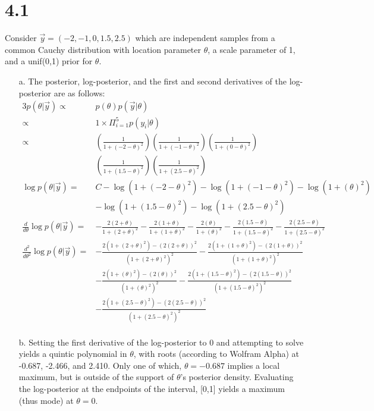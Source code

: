 \documentclass[12pt]{article}
\begin{document}
\section*{4.1} Consider $\vec{y}=(-2, -1, 0, 1.5, 2.5)$ which are independent samples from a common Cauchy distribution with location parameter $\theta$, a scale parameter of 1, and a unif(0,1) prior for $\theta$.
\begin{enumerate}
	\item[a.] The posterior, log-posterior, and the first and second derivatives of the log-posterior are as follows:
	\begin{alignat*}{3}
	p(\theta | \vec{y}) \propto & p(\theta) p(\vec{y} | \theta) \\
	\propto & 1 \times \Pi_{i=1}^5 p(y_i | \theta) \\
	\propto & \left(\frac{1}{1+(-2 - \theta)^2}\right)\left(\frac{1}{1+(-1 - \theta)^2}\right)\left(\frac{1}{1+(0 - \theta)^2}\right) \\ & \left(\frac{1}{1+(1.5 - \theta)^2}\right)\left(\frac{1}{1+(2.5 - \theta)^2}\right) \\
	\log p(\theta | \vec{y}) =&  C - \log\left( 1+(-2-\theta)^2 \right) - \log\left( 1+(-1-\theta)^2 \right)- \log\left( 1+(\theta)^2 \right) \\ & - \log\left( 1+(1.5-\theta)^2 \right)- \log\left( 1+(2.5-\theta)^2 \right) \\
	\frac{d}{d\theta}\log p(\theta | \vec{y}) = & -\frac{2(2+\theta)}{1+(2+\theta)^2}-\frac{2(1+\theta)}{1+(1+\theta)^2}-\frac{2(\theta)}{1+(\theta)^2}-\frac{2(1.5-\theta)}{1+(1.5-\theta)^2}-\frac{2(2.5-\theta)}{1+(2.5-\theta)^2}\\
	\frac{d^2}{d\theta^2}\log p(\theta | \vec{y}) = & -\frac{2(1+(2+\theta)^2)-(2(2+\theta))^2}{(1+(2+\theta)^2)^2}-\frac{2(1+(1+\theta)^2)-(2(1+\theta))^2}{(1+(1+\theta)^2)^2}
	\\ & -\frac{2(1+(\theta)^2)-(2(\theta))^2}{(1+(\theta)^2)^2} -\frac{2(1+(1.5-\theta)^2)-(2(1.5-\theta))^2}{(1+(1.5-\theta)^2)^2}\\ & -\frac{2(1+(2.5-\theta)^2)-(2(2.5-\theta))^2}{(1+(2.5-\theta)^2)^2} \\
	\end{alignat*}
	\item[b.] Setting the first derivative of the log-posterior to 0 and attempting to solve yields a quintic polynomial in $\theta$, with roots (according to Wolfram Alpha) at -0.687, -2.466, and 2.410. Only one of which, $\theta=-0.687$ implies a local maximum, but is outside of the support of $\theta$'s posterior density. Evaluating the log-posterior at the endpoints of the interval, [0,1] yields a maximum (thus mode) at $\theta=0$.

\end{enumerate}
\end{document}
